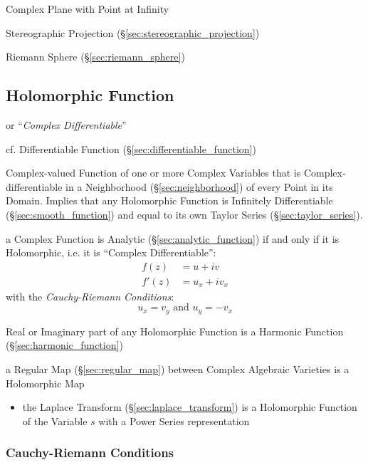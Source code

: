 Complex Plane with Point at Infinity

Stereographic Projection (\S\ref{sec:stereographic_projection})

Riemann Sphere (\S\ref{sec:riemann_sphere})



\subsection{Holomorphic Function}\label{sec:holomorphic_function}

or ``\emph{Complex Differentiable}''

cf. Differentiable Function (\S\ref{sec:differentiable_function})

Complex-valued Function of one or more Complex Variables that is
Complex-differentiable in a Neighborhood (\S\ref{sec:neighborhood}) of
every Point in its Domain. Implies that any Holomorphic Function is
Infinitely Differentiable (\S\ref{sec:smooth_function}) and equal to
its own Taylor Series (\S\ref{sec:taylor_series}).

a Complex Function is Analytic (\S\ref{sec:analytic_function}) if and only if
it is Holomorphic, i.e. it is ``Complex Differentiable'':
\begin{align*}
  f(z)  & = u + iv \\
  f'(z) & = u_x + iv_x
\end{align*}
with the \emph{Cauchy-Riemann Conditions}:
\[
  u_x = v_y \text{ and } u_y = - v_x
\]

Real or Imaginary part of any Holomorphic Function is a Harmonic
Function (\S\ref{sec:harmonic_function})

a Regular Map (\S\ref{sec:regular_map}) between Complex Algebraic Varieties is
a Holomorphic Map


\begin{itemize}
  \item the Laplace Transform (\S\ref{sec:laplace_transform}) is a Holomorphic
    Function of the Variable $s$ with a Power Series representation
\end{itemize}


\subsubsection{Cauchy-Riemann Conditions}\label{sec:cauchy_riemann}

